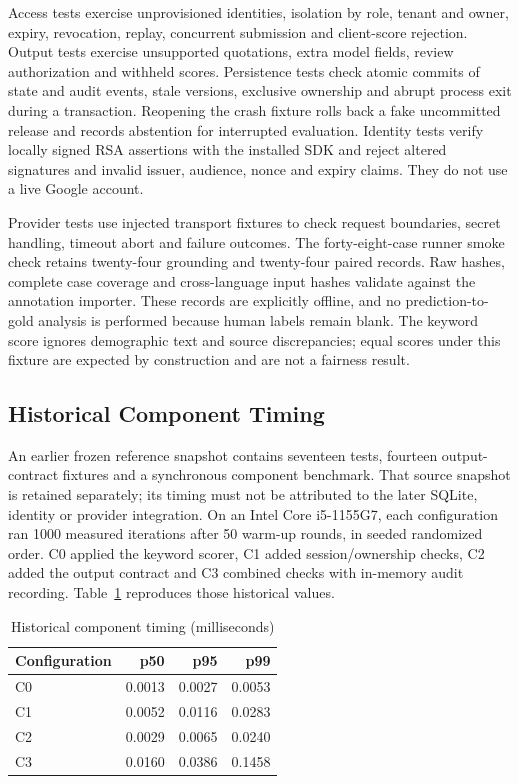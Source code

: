 \documentclass[conference]{IEEEtran}
\begin{document}
Access tests exercise unprovisioned identities, isolation by role, tenant and owner, expiry, revocation, replay, concurrent submission and client-score rejection. Output tests exercise unsupported quotations, extra model fields, review authorization and withheld scores. Persistence tests check atomic commits of state and audit events, stale versions, exclusive ownership and abrupt process exit during a transaction. Reopening the crash fixture rolls back a fake uncommitted release and records abstention for interrupted evaluation. Identity tests verify locally signed RSA assertions with the installed SDK and reject altered signatures and invalid issuer, audience, nonce and expiry claims. They do not use a live Google account.

Provider tests use injected transport fixtures to check request boundaries, secret handling, timeout abort and failure outcomes. The forty-eight-case runner smoke check retains twenty-four grounding and twenty-four paired records. Raw hashes, complete case coverage and cross-language input hashes validate against the annotation importer. These records are explicitly offline, and no prediction-to-gold analysis is performed because human labels remain blank. The keyword score ignores demographic text and source discrepancies; equal scores under this fixture are expected by construction and are not a fairness result.

\subsection{Historical Component Timing}
An earlier frozen reference snapshot contains seventeen tests, fourteen output-contract fixtures and a synchronous component benchmark. That source snapshot is retained separately; its timing must not be attributed to the later SQLite, identity or provider integration. On an Intel Core i5-1155G7, each configuration ran 1000 measured iterations after 50 warm-up rounds, in seeded randomized order. C0 applied the keyword scorer, C1 added session/ownership checks, C2 added the output contract and C3 combined checks with in-memory audit recording. Table~\ref{tab:timing} reproduces those historical values.

\begin{table}[t]
\caption{Historical component timing (milliseconds)}
\label{tab:timing}
\centering
\begin{tabular}{lrrr}
\toprule
Configuration & p50 & p95 & p99 \\
\midrule
C0 & 0.0013 & 0.0027 & 0.0053 \\
C1 & 0.0052 & 0.0116 & 0.0283 \\
C2 & 0.0029 & 0.0065 & 0.0240 \\
C3 & 0.0160 & 0.0386 & 0.1458 \\
\bottomrule
\end{tabular}
\end{table}
\end{document}
